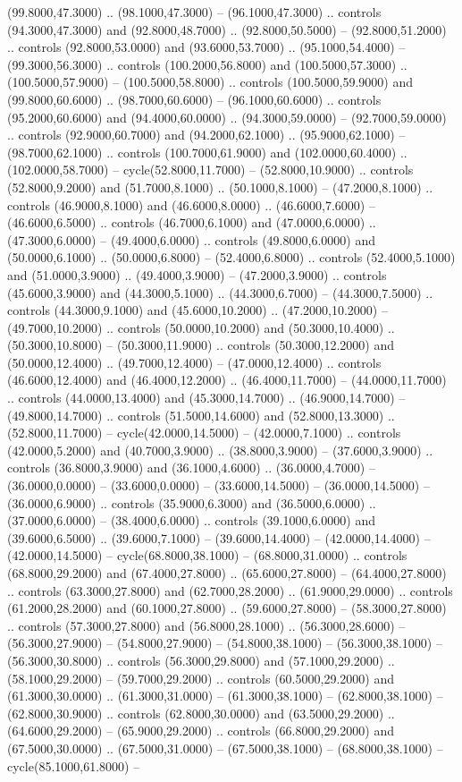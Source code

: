 (99.8000,47.3000) .. (98.1000,47.3000) -- (96.1000,47.3000) .. controls (94.3000,47.3000) and (92.8000,48.7000) .. (92.8000,50.5000) -- (92.8000,51.2000) .. controls (92.8000,53.0000) and (93.6000,53.7000) .. (95.1000,54.4000) -- (99.3000,56.3000) .. controls (100.2000,56.8000) and (100.5000,57.3000) .. (100.5000,57.9000) -- (100.5000,58.8000) .. controls (100.5000,59.9000) and (99.8000,60.6000) .. (98.7000,60.6000) -- (96.1000,60.6000) .. controls (95.2000,60.6000) and (94.4000,60.0000) .. (94.3000,59.0000) -- (92.7000,59.0000) .. controls (92.9000,60.7000) and (94.2000,62.1000) .. (95.9000,62.1000) -- (98.7000,62.1000) .. controls (100.7000,61.9000) and (102.0000,60.4000) .. (102.0000,58.7000) -- cycle(52.8000,11.7000) -- (52.8000,10.9000) .. controls (52.8000,9.2000) and (51.7000,8.1000) .. (50.1000,8.1000) -- (47.2000,8.1000) .. controls (46.9000,8.1000) and (46.6000,8.0000) .. (46.6000,7.6000) -- (46.6000,6.5000) .. controls (46.7000,6.1000) and (47.0000,6.0000) .. (47.3000,6.0000) -- (49.4000,6.0000) .. controls (49.8000,6.0000) and (50.0000,6.1000) .. (50.0000,6.8000) -- (52.4000,6.8000) .. controls (52.4000,5.1000) and (51.0000,3.9000) .. (49.4000,3.9000) -- (47.2000,3.9000) .. controls (45.6000,3.9000) and (44.3000,5.1000) .. (44.3000,6.7000) -- (44.3000,7.5000) .. controls (44.3000,9.1000) and (45.6000,10.2000) .. (47.2000,10.2000) -- (49.7000,10.2000) .. controls (50.0000,10.2000) and (50.3000,10.4000) .. (50.3000,10.8000) -- (50.3000,11.9000) .. controls (50.3000,12.2000) and (50.0000,12.4000) .. (49.7000,12.4000) -- (47.0000,12.4000) .. controls (46.6000,12.4000) and (46.4000,12.2000) .. (46.4000,11.7000) -- (44.0000,11.7000) .. controls (44.0000,13.4000) and (45.3000,14.7000) .. (46.9000,14.7000) -- (49.8000,14.7000) .. controls (51.5000,14.6000) and (52.8000,13.3000) .. (52.8000,11.7000) -- cycle(42.0000,14.5000) -- (42.0000,7.1000) .. controls (42.0000,5.2000) and (40.7000,3.9000) .. (38.8000,3.9000) -- (37.6000,3.9000) .. controls (36.8000,3.9000) and (36.1000,4.6000) .. (36.0000,4.7000) -- (36.0000,0.0000) -- (33.6000,0.0000) -- (33.6000,14.5000) -- (36.0000,14.5000) -- (36.0000,6.9000) .. controls (35.9000,6.3000) and (36.5000,6.0000) .. (37.0000,6.0000) -- (38.4000,6.0000) .. controls (39.1000,6.0000) and (39.6000,6.5000) .. (39.6000,7.1000) -- (39.6000,14.4000) -- (42.0000,14.4000) -- (42.0000,14.5000) -- cycle(68.8000,38.1000) -- (68.8000,31.0000) .. controls (68.8000,29.2000) and (67.4000,27.8000) .. (65.6000,27.8000) -- (64.4000,27.8000) .. controls (63.3000,27.8000) and (62.7000,28.2000) .. (61.9000,29.0000) .. controls (61.2000,28.2000) and (60.1000,27.8000) .. (59.6000,27.8000) -- (58.3000,27.8000) .. controls (57.3000,27.8000) and (56.8000,28.1000) .. (56.3000,28.6000) -- (56.3000,27.9000) -- (54.8000,27.9000) -- (54.8000,38.1000) -- (56.3000,38.1000) -- (56.3000,30.8000) .. controls (56.3000,29.8000) and (57.1000,29.2000) .. (58.1000,29.2000) -- (59.7000,29.2000) .. controls (60.5000,29.2000) and (61.3000,30.0000) .. (61.3000,31.0000) -- (61.3000,38.1000) -- (62.8000,38.1000) -- (62.8000,30.9000) .. controls (62.8000,30.0000) and (63.5000,29.2000) .. (64.6000,29.2000) -- (65.9000,29.2000) .. controls (66.8000,29.2000) and (67.5000,30.0000) .. (67.5000,31.0000) -- (67.5000,38.1000) -- (68.8000,38.1000) -- cycle(85.1000,61.8000) -- 